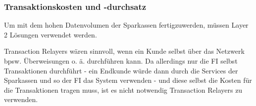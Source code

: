 \subsubsection{Transaktionskosten und -durchsatz}



\bigbreak
\noindent
Um mit dem hohen Datenvolumen der Sparkassen fertigzuwerden, müssen Layer 2 Lösungen verwendet werden. 



\bigbreak
\noindent
Transaction Relayers wären sinnvoll, wenn ein Kunde selbst über das Netzwerk bpsw. Überweisungen o. ä. durchführen kann.
Da allerdings nur die FI selbst Transaktionen durchführt - ein Endkunde würde dann durch die Services der Sparkassen und so der FI das System verwenden - und diese selbst die Kosten für die Transaktionen tragen muss, ist es nicht notwendig Transaction Relayers zu verwenden.